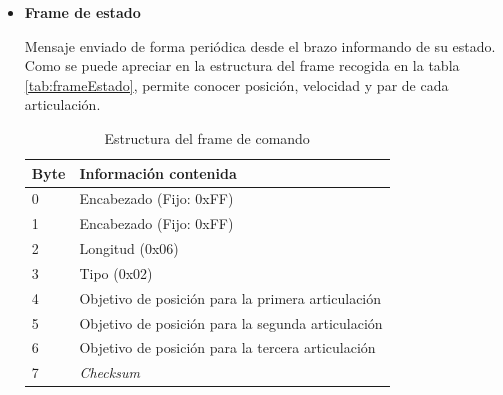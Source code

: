 \begin{itemize}
\item \textbf{Frame de estado}

Mensaje enviado de forma periódica desde el brazo informando de su estado. Como se puede apreciar en la estructura del frame recogida en la tabla \ref{tab:frameEstado}, permite conocer posición, velocidad y par de cada articulación.

\begin{table}[bth]
\begin{center}
\begin{tabular}{|m{15mm}|m{80mm}|}
\hline
\textbf{Byte} & \textbf{Información contenida}\\
\hline
0 & Encabezado (Fijo: 0xFF)\\
\hline
1 & Encabezado (Fijo: 0xFF)\\
\hline
2 & Longitud (0x06)\\
\hline
3 & Tipo (0x02)\\
\hline
4 & Objetivo de posición para la primera articulación\\
\hline
5 & Objetivo de posición para la segunda articulación\\
\hline
6 & Objetivo de posición para la tercera articulación\\
\hline
7 & \textit{Checksum}\\
\hline
\end{tabular}
\end{center}
\caption{Estructura del frame de comando}
\label{tab:frameComando}
\end{table}


\end{itemize}
